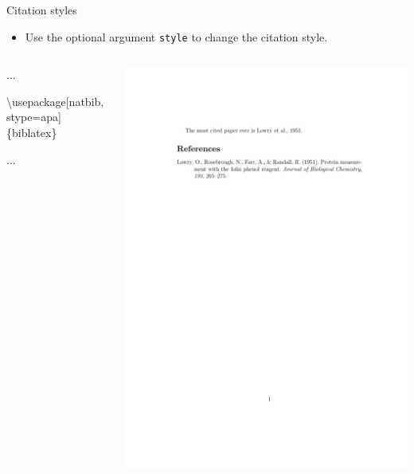 \documentclass[,aspectratio=43]{beamer}
\newenvironment{Shaded}{\begin{snugshade}}{\end{snugshade}}
\newcommand{\BuiltInTok}[1]{#1}
\newcommand{\ExtensionTok}[1]{#1}
\newcommand{\NormalTok}[1]{#1}
\providecommand{\tightlist}{%
  \setlength{\itemsep}{0pt}\setlength{\parskip}{0pt}}
\begin{document}
\begin{frame}[fragile]{Citation styles}
\begin{itemize}
\tightlist
\item
  Use the optional argument \texttt{style} to change the citation style.
\end{itemize}

\begin{columns}[T]
\begin{column}{0.53\textwidth}
\small
\vspace{-1em}

\begin{Shaded}
\begin{Highlighting}[]
\NormalTok{...}

\BuiltInTok{\textbackslash{}usepackage}\NormalTok{[natbib,stype=apa]}
\NormalTok{  \{}\ExtensionTok{biblatex}\NormalTok{\} }

\NormalTok{...}
\end{Highlighting}
\end{Shaded}
\end{column}

\begin{column}{0.43\textwidth}
\vspace{-1em}

\begin{center}\includegraphics[width=1\linewidth]{figure/biblatex2} \end{center}
\end{column}
\end{columns}


\end{frame}
\end{document}
